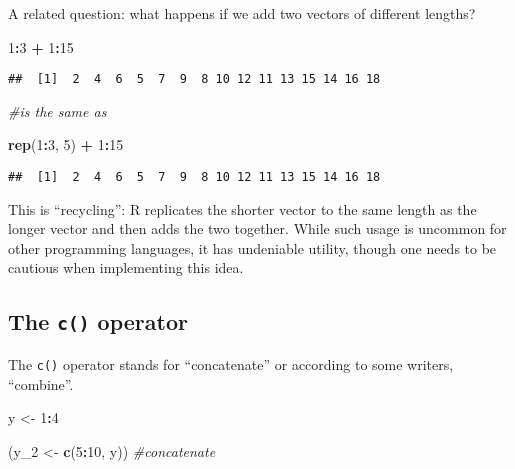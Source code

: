 \documentclass[12pt,]{article}
\newenvironment{Shaded}{\begin{snugshade}}{\end{snugshade}}
\newcommand{\KeywordTok}[1]{\textcolor[rgb]{0.13,0.29,0.53}{\textbf{#1}}}
\newcommand{\DecValTok}[1]{\textcolor[rgb]{0.00,0.00,0.81}{#1}}
\newcommand{\StringTok}[1]{\textcolor[rgb]{0.31,0.60,0.02}{#1}}
\newcommand{\CommentTok}[1]{\textcolor[rgb]{0.56,0.35,0.01}{\textit{#1}}}
\newcommand{\OperatorTok}[1]{\textcolor[rgb]{0.81,0.36,0.00}{\textbf{#1}}}
\newcommand{\NormalTok}[1]{#1}
\begin{document}
A related question: what happens if we add two vectors of different
lengths?

\begin{Shaded}
\begin{Highlighting}[]
\DecValTok{1}\OperatorTok{:}\DecValTok{3} \OperatorTok{+}\StringTok{ }\DecValTok{1}\OperatorTok{:}\DecValTok{15}
\end{Highlighting}
\end{Shaded}

\begin{verbatim}
##  [1]  2  4  6  5  7  9  8 10 12 11 13 15 14 16 18
\end{verbatim}

\begin{Shaded}
\begin{Highlighting}[]
\CommentTok{#is the same as}

\KeywordTok{rep}\NormalTok{(}\DecValTok{1}\OperatorTok{:}\DecValTok{3}\NormalTok{, }\DecValTok{5}\NormalTok{) }\OperatorTok{+}\StringTok{ }\DecValTok{1}\OperatorTok{:}\DecValTok{15}
\end{Highlighting}
\end{Shaded}

\begin{verbatim}
##  [1]  2  4  6  5  7  9  8 10 12 11 13 15 14 16 18
\end{verbatim}

This is ``recycling'': R replicates the shorter vector to the same
length as the longer vector and then adds the two together. While such
usage is uncommon for other programming languages, it has undeniable
utility, though one needs to be cautious when implementing this idea.

\subsection{\texorpdfstring{The \texttt{c()}
operator}{The c() operator}}\label{the-c-operator}

The \texttt{c()} operator stands for ``concatenate'' or according to
some writers, ``combine''.

\begin{Shaded}
\begin{Highlighting}[]
\NormalTok{y <-}\StringTok{ }\DecValTok{1}\OperatorTok{:}\DecValTok{4}

\NormalTok{(y_}\DecValTok{2}\NormalTok{ <-}\StringTok{ }\KeywordTok{c}\NormalTok{(}\DecValTok{5}\OperatorTok{:}\DecValTok{10}\NormalTok{, y)) }\CommentTok{#concatenate}
\end{Highlighting}
\end{Shaded}
\end{document}

